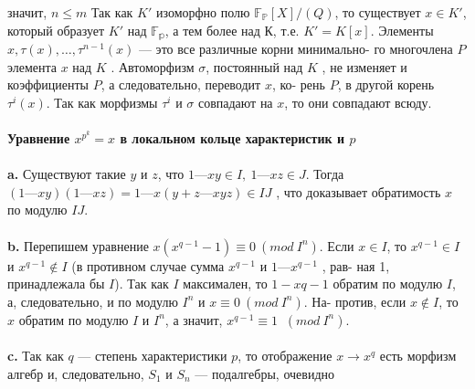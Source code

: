 \pagebreak
\noindent значит, $n \leqslant m$ Так как $K'$ изоморфно полю $\mathbb{F_P}[X]/(Q)$, то существует\linebreak
$x \in K'$, который образует $K'$ над $\mathbb{F_p}$, а тем более над К, т.е. $K' = K[x].$\linebreak
Элементы $x, \tau(x),\ldots,\tau^{n-1}(x)$ --- это все различные корни минимально-\linebreak
го многочлена $P$ элемента $x$ над $K$ . Автоморфизм $\sigma$, постоянный над
$K$ , не изменяет и коэффициенты $P$, а следовательно, переводит $x$, ко-\linebreak
рень $P$, в другой корень $\tau^{i}(x)$. Так как морфизмы $\tau^{i}$ и $\sigma$ совпадают на\linebreak
$x$, то они совпадают всюду.\\
\\
\noindent\textbf{Уравнение $x^{p^{k}} = x$ в локальном кольце характеристик и $p$}\\
\\
\hspace*{15pt}\textbf{a.} Существуют такие $y$ и $z$, что $1 — xy \in I,~ 1 — xz \in J.$ Тогда\linebreak
$(1 — xy)(1 — xz) = 1 — x(y + z — xyz) \in IJ$ , что доказывает обратимость
$x$ по модулю $I J$.\\
\\
\hspace*{15pt}\textbf{b.} Перепишем уравнение $x(x^{q-1} - 1) \equiv 0 ~(mod~ I^{n})$. Если $x \in I$, то\linebreak
$x^{q-1} \in I$ и $x^{q-1} \notin I$ (в противном случае сумма $x^{q-1}$ и $1 — x^{q-1}$ , рав-\linebreak
ная 1, принадлежала бы $I$). Так как $I$ максимален, то $1 - x{q-1}$ обратим
по модулю $I$, а, следовательно, и по модулю $I^{n}$ и $x \equiv 0 ~(mod~ I^{n})$. На-\linebreak
против, если $x \notin I$, то $x$ обратим по модулю $I$ и $I^{n}$, а значит, $x^{q-1} \equiv 1$\linebreak
$~(mod~ I^{n})$.\\
\\
\hspace*{15pt}\textbf{c.} Так как $q$ --- степень характеристики $p$, то отображение $x \rightarrow x^{q}$
есть морфизм алгебр и, следовательно, $S_1$ и $S_n$ --- подалгебры, очевидно
